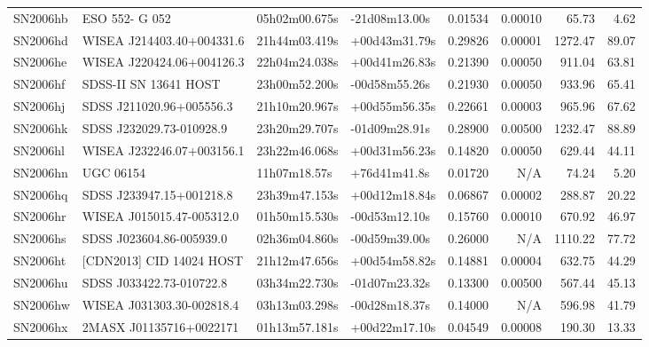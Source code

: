 \begin{longtable}{llllrrrr}
SN2006hb         &                  ESO 552- G 052 &   05h02m00.675s &   -21d08m13.00s &  0.01534 &  0.00010 &    65.73 &        4.62 \\
SN2006hd         &       WISEA J214403.40+004331.6 &   21h44m03.419s &   +00d43m31.79s &  0.29826 &  0.00001 &  1272.47 &       89.07 \\
SN2006he         &       WISEA J220424.06+004126.3 &   22h04m24.038s &   +00d41m26.83s &  0.21390 &  0.00050 &   911.04 &       63.81 \\
SN2006hf         &           SDSS-II SN 13641 HOST &   23h00m52.200s &   -00d58m55.26s &  0.21930 &  0.00050 &   933.96 &       65.41 \\
SN2006hj         &        SDSS J211020.96+005556.3 &   21h10m20.967s &   +00d55m56.35s &  0.22661 &  0.00003 &   965.96 &       67.62 \\
SN2006hk         &        SDSS J232029.73-010928.9 &   23h20m29.707s &   -01d09m28.91s &  0.28900 &  0.00500 &  1232.47 &       88.89 \\
SN2006hl         &       WISEA J232246.07+003156.1 &   23h22m46.068s &   +00d31m56.23s &  0.14820 &  0.00050 &   629.44 &       44.11 \\
SN2006hn         &                       UGC 06154 &    11h07m18.57s &    +76d41m41.8s &  0.01720 &      N/A &    74.24 &        5.20 \\
SN2006hq         &        SDSS J233947.15+001218.8 &   23h39m47.153s &   +00d12m18.84s &  0.06867 &  0.00002 &   288.87 &       20.22 \\
SN2006hr         &       WISEA J015015.47-005312.0 &   01h50m15.530s &   -00d53m12.10s &  0.15760 &  0.00010 &   670.92 &       46.97 \\
SN2006hs         &        SDSS J023604.86-005939.0 &   02h36m04.860s &   -00d59m39.00s &  0.26000 &      N/A &  1110.22 &       77.72 \\
SN2006ht         &        [CDN2013] CID 14024 HOST &   21h12m47.656s &   +00d54m58.82s &  0.14881 &  0.00004 &   632.75 &       44.29 \\
SN2006hu         &        SDSS J033422.73-010722.8 &   03h34m22.730s &   -01d07m23.32s &  0.13300 &  0.00500 &   567.44 &       45.13 \\
SN2006hw         &       WISEA J031303.30-002818.4 &   03h13m03.298s &   -00d28m18.37s &  0.14000 &      N/A &   596.98 &       41.79 \\
SN2006hx         &         2MASX J01135716+0022171 &   01h13m57.181s &   +00d22m17.10s &  0.04549 &  0.00008 &   190.30 &       13.33 \\

\end{longtable}
